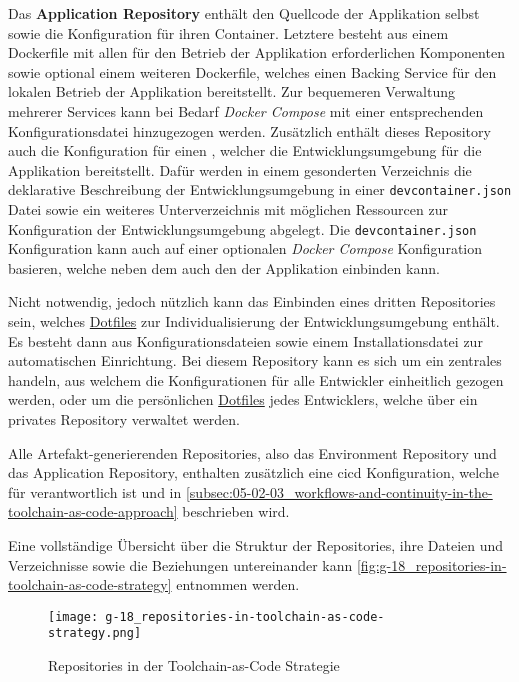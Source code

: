 Das \textbf{Application Repository} enthält den Quellcode der Applikation selbst sowie die Konfiguration für ihren Container. Letztere besteht aus einem Dockerfile mit allen für den Betrieb der Applikation erforderlichen Komponenten sowie optional einem weiteren Dockerfile, welches einen Backing Service für den lokalen Betrieb der Applikation bereitstellt. Zur bequemeren Verwaltung mehrerer Services kann bei Bedarf \textit{Docker Compose} mit einer entsprechenden Konfigurationsdatei hinzugezogen werden. Zusätzlich enthält dieses Repository auch die Konfiguration für einen , welcher die Entwicklungsumgebung für die Applikation bereitstellt. \linebreak[4]
Dafür werden in einem gesonderten Verzeichnis die deklarative Beschreibung der Entwicklungsumgebung in einer \texttt{devcontainer.json} Datei sowie ein weiteres Unterverzeichnis mit möglichen Ressourcen zur Konfiguration der Entwicklungsumgebung abgelegt. Die \texttt{devcontainer.json} Konfiguration kann auch auf einer optionalen \textit{Docker Compose} Konfiguration basieren, welche neben dem  auch den  der Applikation einbinden kann.

Nicht notwendig, jedoch nützlich kann das Einbinden eines dritten Repositories sein, welches \hyperref[sec:03-04_dotfiles]{Dotfiles} zur Individualisierung der Entwicklungsumgebung enthält. Es besteht dann aus Konfigurationsdateien sowie einem Installationsdatei zur automatischen Einrichtung. Bei diesem Repository kann es sich um ein zentrales handeln, aus welchem die Konfigurationen für alle Entwickler einheitlich gezogen werden, oder um die persönlichen \hyperref[sec:03-04_dotfiles]{Dotfiles} jedes Entwicklers, welche über ein privates Repository verwaltet werden.

Alle Artefakt-generierenden Repositories, also das Environment Repository und das Application Repository, enthalten zusätzlich eine \Gls{cicd} Konfiguration, welche für  verantwortlich ist und in \autoref{subsec:05-02-03_workflows-and-continuity-in-the-toolchain-as-code-approach} beschrieben wird.

Eine vollständige Übersicht über die Struktur der Repositories, ihre Dateien und Verzeichnisse sowie die Beziehungen untereinander kann \autoref{fig:g-18_repositories-in-toolchain-as-code-strategy} entnommen werden.

\begin{figure}[htp]
    \centering
    \texttt{[image: g-18\_repositories-in-toolchain-as-code-strategy.png]}
    \caption{Repositories in der Toolchain-as-Code Strategie}
    \label{fig:g-18_repositories-in-toolchain-as-code-strategy}
\end{figure}

